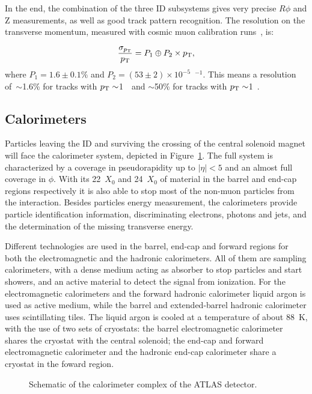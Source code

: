 In the end, the combination of the three ID subsystems gives very precise $R\phi$ and Z measurements, as well as good track pattern recognition.
The resolution on the transverse momentum, measured with cosmic muon calibration runs~\cite{id_cosmic}, is:

\begin{equation}\label{eq:momentumres}
\frac{\sigma_{\pt}}{\pt}=P_1 \oplus P_2 \times \pt,
	\end{equation}
where $P_1=1.6\pm0.1\%$ and $P_2=(53\pm2)\times10^{-5}$~\GeV$^{-1}$. This means a 
resolution of~$\sim$1.6\% for tracks with $\pt\sim$1~\GeV\ and 
$\sim$50\% for tracks with $\pt\sim$1~\tev.


\subsection{Calorimeters}\label{sec:calo}

Particles leaving the ID and surviving the crossing of the central solenoid magnet
will face the calorimeter system, depicted in Figure~\ref{fig:calorimeters}.
The full system is characterized by a coverage
in pseudorapidity up to $|\eta|<5$ and an almost full coverage in $\phi$. With its 
22~$X_0$ and 24~$X_0$ of material in the barrel and end-cap regions respectively 
it is also able to stop most of the non-muon particles from the interaction.
Besides particles energy measurement, the calorimeters provide particle identification
information, discriminating electrons, photons and jets, and the determination
of the missing transverse energy.

Different technologies are used in the barrel, end-cap and forward regions for both the
electromagnetic and the hadronic calorimeters. All of them are sampling calorimeters,
with a dense medium acting as absorber to stop particles and start showers, and an
active material to detect the signal from ionization. For the electromagnetic calorimeters
and the forward hadronic calorimeter liquid argon is used as active medium, while the
barrel and extended-barrel hadronic calorimeter uses scintillating tiles.
The liquid argon is cooled at a temperature of about 88~K, with the use of two sets of cryostats:
the barrel electromagnetic calorimeter shares the cryostat with the central solenoid;
the end-cap and forward electromagnetic calorimeter and the hadronic end-cap calorimeter
share a cryostat in the foward region.

\begin{figure}[tb]\begin{center}
	\caption{Schematic of the calorimeter complex of the ATLAS detector.\label{fig:calorimeters}}
\end{center}\end{figure}

